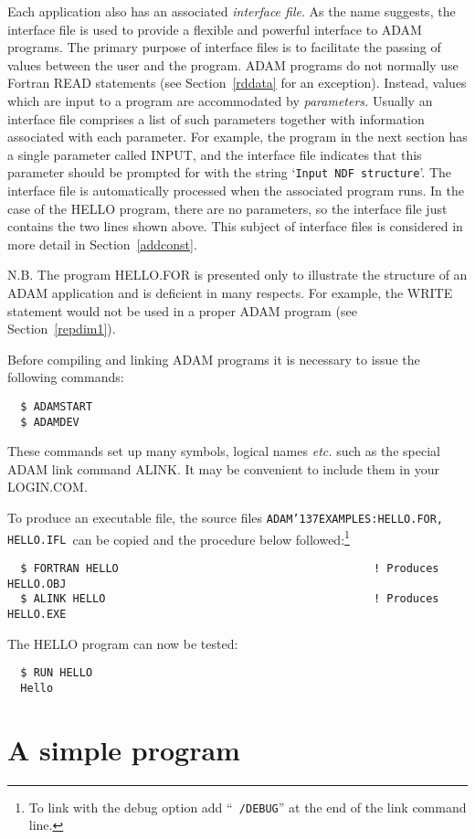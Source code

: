 \documentclass[twoside,11pt]{article}
\renewcommand{\_}{{\tt\char'137}}
\newcommand{\xlabel}[1]{}
\begin{document}
Each application also has an associated {\sl interface file}.
As the name suggests, the interface file is used to provide a flexible
and powerful interface to  ADAM programs.
The primary purpose of interface files is to facilitate the passing
of values between the user and the program.
ADAM programs do not normally use Fortran READ statements 
(see Section~\ref{rddata} for an exception).
Instead, values which are input to  a program are accommodated by 
{\sl parameters.} 
Usually an interface file comprises  a list of  
such parameters together with information associated with each parameter.
For example, the program in the next section has a single parameter
called INPUT, and the interface file indicates that this  parameter should
be prompted for with the string `{\tt Input NDF structure}'.
The interface file is automatically processed when the associated program
runs.
In the case of the HELLO program, there are no parameters, so the interface 
file just contains the two lines shown above.
This subject of interface files is considered in more detail in 
Section~\ref{addconst}.

N.B. The program HELLO.FOR is presented only to illustrate the 
structure of an ADAM application and is deficient in many respects.
For example, the WRITE statement would not be used in 
a proper ADAM program (see Section~\ref{repdim1}).

Before compiling and linking ADAM programs it is necessary to issue the 
following commands:
\begin{verbatim}
  $ ADAMSTART
  $ ADAMDEV
\end{verbatim}
These commands set up many symbols, logical names {\it etc.}
such as the special ADAM link command ALINK.
It may be convenient to include them in your LOGIN.COM.

To produce an executable file, the 
source files {\tt ADAM\_EXAMPLES:HELLO.FOR, HELLO.IFL}\ can be copied and the
procedure below  followed:\footnote{To link with the debug option add 
``{\tt~/DEBUG}'' at the end of the link 
command line.}
\begin{verbatim}
  $ FORTRAN HELLO                                       ! Produces HELLO.OBJ
  $ ALINK HELLO                                         ! Produces HELLO.EXE
\end{verbatim}
The HELLO program can now be tested:
\begin{verbatim}
  $ RUN HELLO
  Hello
\end{verbatim}

\newpage
\section{A simple program\label{repdim}\xlabel{a_simple_program}}
\end{document}
